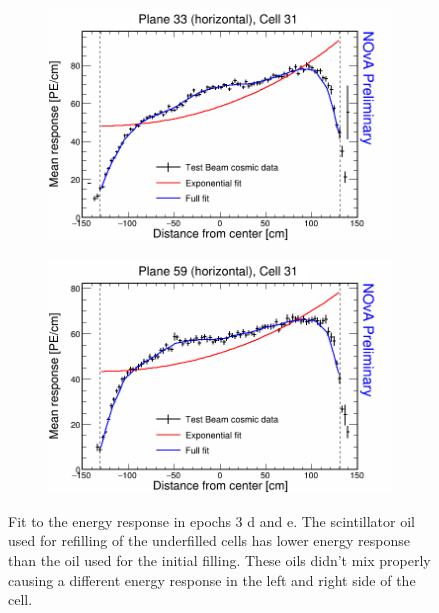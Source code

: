 \begin{figure}[h]
  \begin{subfigure}{0.495\textwidth}
    \includegraphics[width=\linewidth]{Plots/RelativeCalibrationResults/ep3de_033_031.png}
  \end{subfigure}
  \begin{subfigure}{0.495\textwidth}
    \includegraphics[width=\linewidth]{Plots/RelativeCalibrationResults/ep3de_059_031.png}
  \end{subfigure}
  \caption{Fit to the energy response in epochs 3 d and e. The scintillator oil used for refilling of the underfilled cells has lower energy response than the oil used for the initial filling. These oils didn't mix properly causing a different energy response in the left and right side of the cell.}
  \label{fig:AttenfitResultsEpoch3de_RefilledDiscrepancy}
\end{figure}

